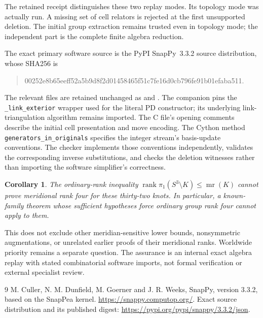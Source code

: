 \documentclass[11pt]{article}
\newtheorem{corollary}[theorem]{Corollary}
\begin{document}
The retained receipt
 distinguishes these
two replay modes. Its topology mode was actually run. A missing
set of cell relators is rejected at the first unsupported deletion.
The initial group extraction remains trusted even in topology mode;
the independent part is the complete finite algebra reduction.

The exact primary software source is the PyPI SnapPy~3.3.2 source
distribution, whose SHA256 is
\begin{quote}\ttfamily\small
00252e8b65eeff52a5b9d8f2d01458465f51c7fe16d0cb796fe91b01efaba511.
\end{quote}
The relevant files are retained unchanged as
 and
.
The companion  pins the
\texttt{\_link\_exterior} wrapper used for the literal PD constructor;
its underlying link-triangulation algorithm remains imported.
The C file's opening comments describe the initial cell presentation
and move encoding. The Cython method
\texttt{generators\_in\_originals} specifies the integer stream's
basis-update conventions. The checker implements those conventions
independently, validates the corresponding inverse substitutions,
and checks the deletion witnesses rather than importing the
software simplifier's correctness.

\begin{corollary}\label{cor:ordinary}
The ordinary-rank inequality
$\operatorname{rank}\pi_1(S^3\setminus K)\le\operatorname{mr}(K)$
cannot prove meridional rank four for these thirty-two knots. In particular,
a known-family theorem whose sufficient hypotheses force ordinary
group rank four cannot apply to them.
\end{corollary}

This does not exclude other meridian-sensitive lower bounds,
nonsymmetric augmentations, or unrelated earlier proofs of their
meridional ranks. Worldwide priority remains a separate question.
The assurance is an internal exact algebra replay with stated
combinatorial software imports, not formal verification or external
specialist review.

\begin{thebibliography}{9}
 M. Culler, N. M. Dunfield, M. Goerner and
J. R. Weeks, SnapPy, version 3.3.2, based on the SnapPea kernel.
\url{https://snappy.computop.org/}.
Exact source distribution and its published digest:
\url{https://pypi.org/pypi/snappy/3.3.2/json}.
\end{thebibliography}
\end{document}
